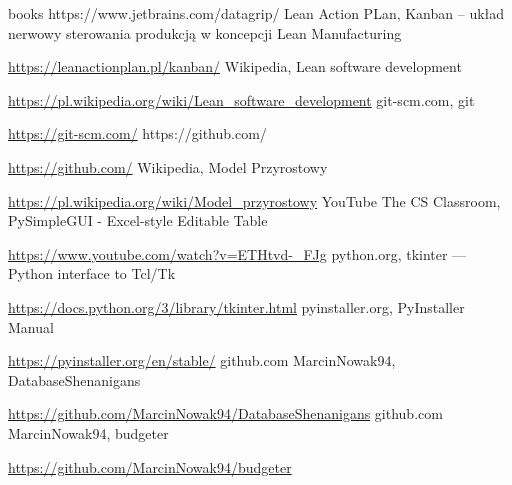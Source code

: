 \documentclass[a4paper,10pt, twoside]{report}
\begin{document}
\begin{thebibliography} {books}
{    https://www.jetbrains.com/datagrip/}
 Lean Action PLan, Kanban – układ nerwowy sterowania produkcją w koncepcji Lean Manufacturing \raggedright\url{
    https://leanactionplan.pl/kanban/}
 Wikipedia, Lean software development \raggedright\url{
    https://pl.wikipedia.org/wiki/Lean_software_development}
 git-scm.com, git \raggedright\url{
    https://git-scm.com/}
 https://github.com/ \raggedright\url{
    https://github.com/}
 Wikipedia, Model Przyrostowy \raggedright\url{
    https://pl.wikipedia.org/wiki/Model_przyrostowy}
 YouTube The CS Classroom, PySimpleGUI - Excel-style Editable Table \raggedright\url{
    https://www.youtube.com/watch?v=ETHtvd-_FJg}
 python.org, tkinter — Python interface to Tcl/Tk \raggedright\url{
    https://docs.python.org/3/library/tkinter.html}
 pyinstaller.org, PyInstaller Manual \raggedright\url{
    https://pyinstaller.org/en/stable/}
 github.com MarcinNowak94, DatabaseShenanigans \raggedright\url{
    https://github.com/MarcinNowak94/DatabaseShenanigans}
 github.com MarcinNowak94, budgeter \raggedright\url{
    https://github.com/MarcinNowak94/budgeter}

\end{thebibliography}

\listoffigures
\listoftables
\lstlistoflistings
\end{document}
